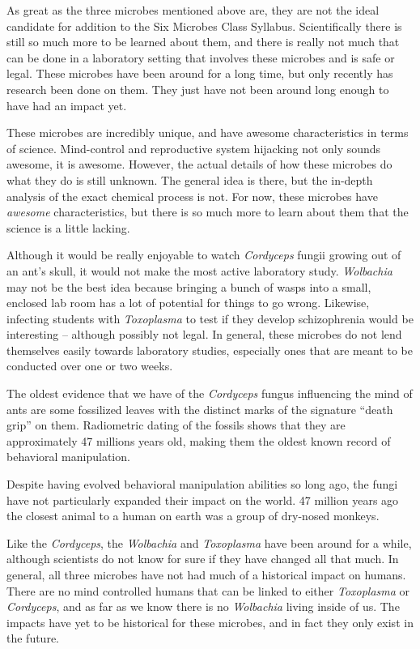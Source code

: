 \documentclass[twocolumn]{article}
\begin{document}
As great as the three microbes mentioned above are, they are not the ideal candidate for addition to the Six Microbes Class Syllabus. Scientifically there is still so much more to be learned about them, and there is really not much that can be done in a laboratory setting that involves these microbes and is safe or legal. These microbes have been around for a long time, but only recently has research been done on them. They just have not been around long enough to have had an impact yet.

These microbes are incredibly unique, and have awesome characteristics in terms of science. Mind-control and reproductive system hijacking not only sounds awesome, it is awesome. However, the actual details of how these microbes do what they do is still unknown. The general idea is there, but the in-depth analysis of the exact chemical process is not. For now, these microbes have \textit{awesome} characteristics, but there is so much more to learn about them that the science is a little lacking.

Although it would be really enjoyable to watch \textit{Cordyceps} fungii growing out of an ant’s skull, it would not make the most active laboratory study. \textit{Wolbachia} may not be the best idea because bringing a bunch of wasps into a small, enclosed lab room has a lot of potential for things to go wrong. Likewise, infecting students with \textit{Toxoplasma} to test if they develop schizophrenia would be interesting -- although possibly not legal. In general, these microbes do not lend themselves easily towards laboratory studies, especially ones that are meant to be conducted over one or two weeks. 

The oldest evidence that we have of the \textit{Cordyceps} fungus influencing the mind of ants are some fossilized leaves with the distinct marks of the signature “death grip” on them. Radiometric dating of the fossils shows that they are approximately 47 millions years old, making them the oldest known record of behavioral manipulation.\cite{old_leaf}

Despite having evolved behavioral manipulation abilities so long ago, the fungi have not particularly expanded their impact on the world. 47 million years ago the closest animal to a human on earth was a group of dry-nosed monkeys. 

Like the \textit{Cordyceps}, the \textit{Wolbachia} and \textit{Toxoplasma} have been around for a while, although scientists do not know for sure if they have changed all that much. In general, all three microbes have not had much of a historical impact on humans. There are no mind controlled humans that can be linked to either \textit{Toxoplasma} or \textit{Cordyceps}, and as far as we know there is no \textit{Wolbachia} living inside of us. The impacts have yet to be historical for these microbes, and in fact they only exist in the future.
\end{document}
